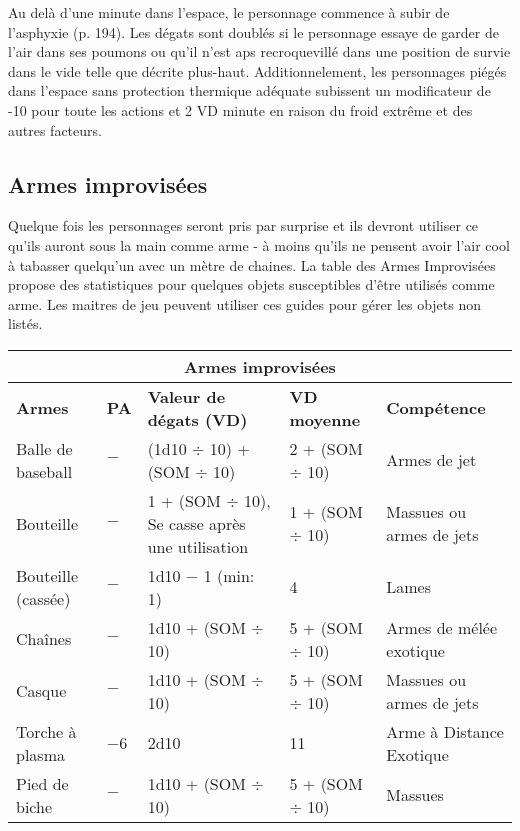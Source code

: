 Au delà d'une minute dans l'espace, le personnage commence à subir de l'asphyxie (p. 194). Les dégats sont doublés si le personnage essaye de garder de l'air dans ses poumons ou qu'il n'est aps recroquevillé dans une position de survie dans le vide telle que décrite plus-haut.
Additionnelement, les personnages piégés dans l'espace sans protection thermique adéquate subissent un modificateur de -10 pour toute les actions et 2 VD minute en raison du froid extrême et des autres facteurs. 

\subsection{Armes improvisées} \label{sec:improvised-weapons} 

Quelque fois les personnages seront pris par surprise et ils devront utiliser ce qu'ils auront sous la main comme arme - à moins qu'ils ne pensent avoir l'air cool à tabasser quelqu'un avec un mètre de chaines. La table des Armes Improvisées propose des statistiques pour quelques objets susceptibles d'être utilisés comme arme. Les maitres de jeu peuvent utiliser ces guides pour gérer les objets non listés. 

\begin{table} \begin{tabularx}{\textwidth}{|l|l|l|l|X|} \hline

\multicolumn{5}{|c|}{\textbf{Armes improvisées}} \\ \hline

\textbf{Armes}	&\textbf{PA}	&\textbf{Valeur de dégats (VD)}	&\textbf{VD moyenne}	&\textbf{Compétence}	\\ \hline

Balle de baseball	&$-$	&(1d10 $\div$ 10) + (SOM $\div$ 10)	&2 + (SOM $\div$ 10)	&Armes de jet	\\ \hline

Bouteille	&$-$	&1 + (SOM $\div$ 10), Se casse après une utilisation	&1 + (SOM $\div$ 10)	&Massues ou armes de jets	\\ \hline

Bouteille (cassée)	&$-$	&1d10 $-$ 1 (min: 1)	&4	&Lames	\\ \hline

Chaînes	&$-$	&1d10 + (SOM $\div$ 10)	&5 + (SOM $\div$ 10)	&Armes de mélée exotique\\ \hline

Casque	&$-$	&1d10 + (SOM $\div$ 10)	&5 + (SOM $\div$ 10)	&Massues ou armes de jets	\\ \hline

Torche à plasma	&$-$6	&2d10	&11	&Arme à Distance Exotique \\ \hline

Pied de biche	&$-$ &1d10 + (SOM $\div$ 10)	&5 + (SOM $\div$ 10)	&Massues	\\ \hline

\end{tabularx} \label{tab:improvised-weapons} \end{table} 

